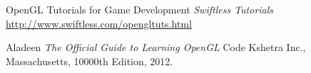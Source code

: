 \documentclass[12pt]{article} %
\begin{document}
\begin{thebibliography}{9}

  OpenGL Tutorials for Game Development
  \emph{Swiftless Tutorials}
 \url{http://www.swiftless.com/opengltuts.html}

Aladeen
\emph{The Official Guide to
Learning OpenGL}
Code Kshetra Inc., Massachusetts,
  10000th Edition,
  2012.


\end{thebibliography}
\end{document}
